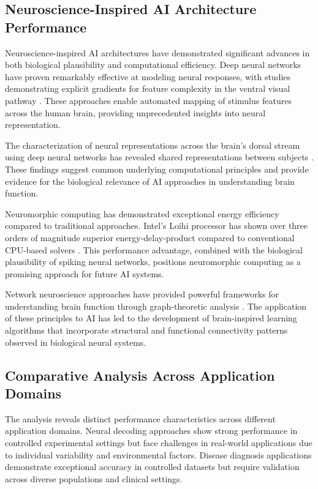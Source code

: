 \documentclass[conference]{IEEEtran}
\begin{document}
\subsection{Neuroscience-Inspired AI Architecture Performance}

Neuroscience-inspired AI architectures have demonstrated significant advances in both biological plausibility and computational efficiency. Deep neural networks have proven remarkably effective at modeling neural responses, with studies demonstrating explicit gradients for feature complexity in the ventral visual pathway \citep{gucluDeepNeuralNetworks2015}. These approaches enable automated mapping of stimulus features across the human brain, providing unprecedented insights into neural representation.

The characterization of neural representations across the brain's dorsal stream using deep neural networks has revealed shared representations between subjects \citep{gucluDeepNeuralNetworks2015}. These findings suggest common underlying computational principles and provide evidence for the biological relevance of AI approaches in understanding brain function.

Neuromorphic computing has demonstrated exceptional energy efficiency compared to traditional approaches. Intel's Loihi processor has shown over three orders of magnitude superior energy-delay-product compared to conventional CPU-based solvers \citep{daviesLoihiNeuromorphicManycore2018}. This performance advantage, combined with the biological plausibility of spiking neural networks, positions neuromorphic computing as a promising approach for future AI systems.

Network neuroscience approaches have provided powerful frameworks for understanding brain function through graph-theoretic analysis \citep{bassettNetworkNeuroscience2017}. The application of these principles to AI has led to the development of brain-inspired learning algorithms that incorporate structural and functional connectivity patterns observed in biological neural systems.

\subsection{Comparative Analysis Across Application Domains}

The analysis reveals distinct performance characteristics across different application domains. Neural decoding approaches show strong performance in controlled experimental settings but face challenges in real-world applications due to individual variability and environmental factors. Disease diagnosis applications demonstrate exceptional accuracy in controlled datasets but require validation across diverse populations and clinical settings.
\end{document}

